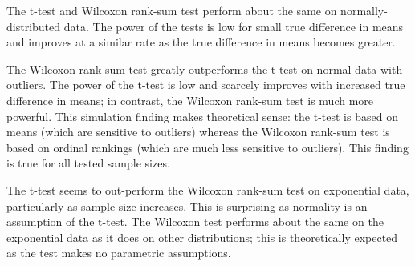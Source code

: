 \documentclass{report}
\begin{document}
The t-test and Wilcoxon rank-sum
test perform about the same on normally-distributed data. The power of the tests
is low for small true difference in means and improves at a similar rate as the
true difference in means becomes greater.

The Wilcoxon rank-sum test greatly outperforms the t-test on normal
data with outliers. The power of the t-test is low and scarcely improves with
increased true difference in means; in contrast, the Wilcoxon rank-sum test is
much more powerful. This simulation finding makes theoretical sense: the
t-test is based on means (which are sensitive to outliers) whereas the
Wilcoxon rank-sum test is based on ordinal rankings (which are much less
sensitive to outliers). This finding is true for all tested sample sizes.

The t-test seems to out-perform the Wilcoxon rank-sum test on exponential data,
particularly as sample size increases. This is surprising as normality is an
assumption of the t-test. The Wilcoxon test performs about the same on the
exponential data as it does on other distributions; this is theoretically
expected as the test makes no parametric assumptions.
\end{document}
